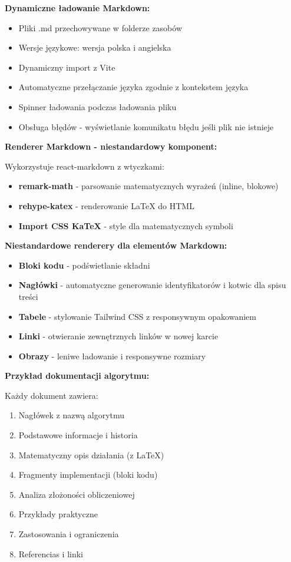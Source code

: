 \documentclass[12pt,a4paper]{article}
\begin{document}
\textbf{Dynamiczne ładowanie Markdown:}
\begin{itemize}
    \item Pliki .md przechowywane w folderze zasobów
    \item Wersje językowe: wersja polska i angielska
    \item Dynamiczny import z Vite
    \item Automatyczne przełączanie języka zgodnie z kontekstem języka
    \item Spinner ładowania podczas ładowania pliku
    \item Obsługa błędów - wyświetlanie komunikatu błędu jeśli plik nie istnieje
\end{itemize}

\textbf{Renderer Markdown - niestandardowy komponent:}

Wykorzystuje react-markdown z wtyczkami:
\begin{itemize}
    \item \textbf{remark-math} - parsowanie matematycznych wyrażeń (inline, blokowe)
    \item \textbf{rehype-katex} - renderowanie LaTeX do HTML
    \item \textbf{Import CSS KaTeX} - style dla matematycznych symboli
\end{itemize}

\textbf{Niestandardowe renderery dla elementów Markdown:}
\begin{itemize}
    \item \textbf{Bloki kodu} - podświetlanie składni
    \item \textbf{Nagłówki} - automatyczne generowanie identyfikatorów i kotwic dla spisu treści
    \item \textbf{Tabele} - stylowanie Tailwind CSS z responsywnym opakowaniem
    \item \textbf{Linki} - otwieranie zewnętrznych linków w nowej karcie
    \item \textbf{Obrazy} - leniwe ładowanie i responsywne rozmiary
\end{itemize}

\textbf{Przykład dokumentacji algorytmu:}

Każdy dokument zawiera:
\begin{enumerate}
    \item Nagłówek z nazwą algorytmu
    \item Podstawowe informacje i historia
    \item Matematyczny opis działania (z LaTeX)
    \item Fragmenty implementacji (bloki kodu)
    \item Analiza złożoności obliczeniowej
    \item Przykłady praktyczne
    \item Zastosowania i ograniczenia
    \item Referencias i linki
\end{enumerate}
\end{document}
